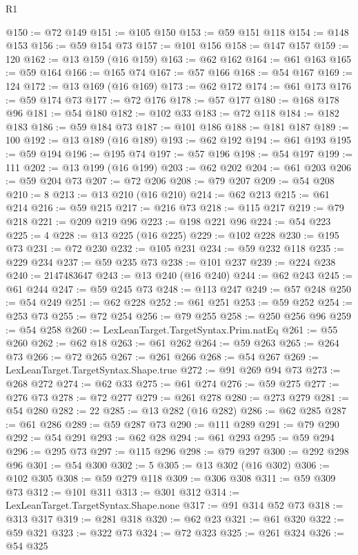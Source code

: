 \begin{lexlean}{R1}
\begin{coremodule}
@150 := @72 @149
@151 := @105 @150
@153 := @59 @151 @118
@154 := @148 @153
@156 := @59 @154 @73
@157 := @101 @156
@158 := @147 @157
@159 := 120
@162 := @13 @159 (@16 @159)
@163 := @62 @162
@164 := @61 @163
@165 := @59 @164
@166 := @165 @74
@167 := @57 @166
@168 := @54 @167
@169 := 124
@172 := @13 @169 (@16 @169)
@173 := @62 @172
@174 := @61 @173
@176 := @59 @174 @73
@177 := @72 @176
@178 := @57 @177
@180 := @168 @178 @96
@181 := @54 @180
@182 := @102 @33
@183 := @72 @118
@184 := @182 @183
@186 := @59 @184 @73
@187 := @101 @186
@188 := @181 @187
@189 := 100
@192 := @13 @189 (@16 @189)
@193 := @62 @192
@194 := @61 @193
@195 := @59 @194
@196 := @195 @74
@197 := @57 @196
@198 := @54 @197
@199 := 111
@202 := @13 @199 (@16 @199)
@203 := @62 @202
@204 := @61 @203
@206 := @59 @204 @73
@207 := @72 @206
@208 := @79 @207
@209 := @54 @208
@210 := 8
@213 := @13 @210 (@16 @210)
@214 := @62 @213
@215 := @61 @214
@216 := @59 @215
@217 := @216 @73
@218 := @115 @217
@219 := @79 @218
@221 := @209 @219 @96
@223 := @198 @221 @96
@224 := @54 @223
@225 := 4
@228 := @13 @225 (@16 @225)
@229 := @102 @228
@230 := @195 @73
@231 := @72 @230
@232 := @105 @231
@234 := @59 @232 @118
@235 := @229 @234
@237 := @59 @235 @73
@238 := @101 @237
@239 := @224 @238
@240 := 2147483647
@243 := @13 @240 (@16 @240)
@244 := @62 @243
@245 := @61 @244
@247 := @59 @245 @73
@248 := @113 @247
@249 := @57 @248
@250 := @54 @249
@251 := @62 @228
@252 := @61 @251
@253 := @59 @252
@254 := @253 @73
@255 := @72 @254
@256 := @79 @255
@258 := @250 @256 @96
@259 := @54 @258
@260 := LexLeanTarget.TargetSyntax.Prim.natEq
@261 := @55 @260
@262 := @62 @18
@263 := @61 @262
@264 := @59 @263
@265 := @264 @73
@266 := @72 @265
@267 := @261 @266
@268 := @54 @267
@269 := LexLeanTarget.TargetSyntax.Shape.true
@272 := @91 @269 @94 @73
@273 := @268 @272
@274 := @62 @33
@275 := @61 @274
@276 := @59 @275
@277 := @276 @73
@278 := @72 @277
@279 := @261 @278
@280 := @273 @279
@281 := @54 @280
@282 := 22
@285 := @13 @282 (@16 @282)
@286 := @62 @285
@287 := @61 @286
@289 := @59 @287 @73
@290 := @111 @289
@291 := @79 @290
@292 := @54 @291
@293 := @62 @28
@294 := @61 @293
@295 := @59 @294
@296 := @295 @73
@297 := @115 @296
@298 := @79 @297
@300 := @292 @298 @96
@301 := @54 @300
@302 := 5
@305 := @13 @302 (@16 @302)
@306 := @102 @305
@308 := @59 @279 @118
@309 := @306 @308
@311 := @59 @309 @73
@312 := @101 @311
@313 := @301 @312
@314 := LexLeanTarget.TargetSyntax.Shape.none
@317 := @91 @314 @52 @73
@318 := @313 @317
@319 := @281 @318
@320 := @62 @23
@321 := @61 @320
@322 := @59 @321
@323 := @322 @73
@324 := @72 @323
@325 := @261 @324
@326 := @54 @325

\end{coremodule}
\end{lexlean}
